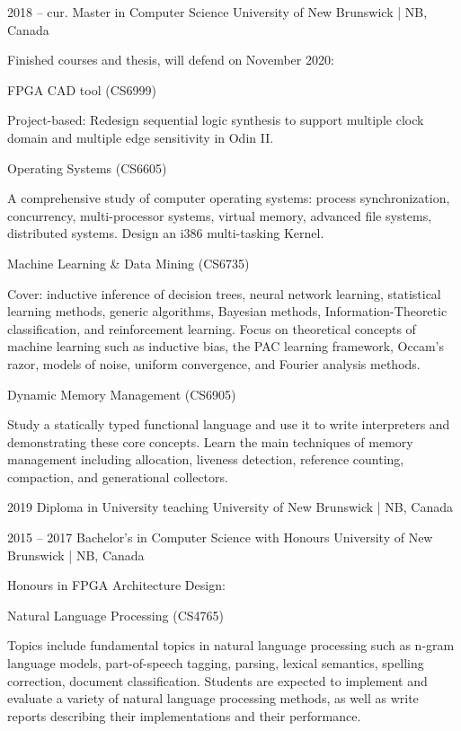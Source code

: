 \documentclass{developercv} %
\begin{document}

\begin{entrylist}

	\entry
	{2018 -- cur.}
	{Master in Computer Science}
	{University of New Brunswick | NB, Canada}
	{Finished courses and thesis, will defend on November 2020:

		\textbullet{} FPGA CAD tool (CS6999)
		\begin{smallQuote}
			Project-based: Redesign sequential logic synthesis to support multiple clock domain and multiple edge sensitivity in Odin II.
		\end{smallQuote}

		\textbullet{} Operating Systems (CS6605)
		\begin{smallQuote}
			A comprehensive study of computer operating systems: process synchronization, concurrency, multi-processor systems, virtual memory, advanced file systems, distributed systems. 
			Design an i386 multi-tasking Kernel.
		\end{smallQuote}

		\textbullet{} Machine Learning \& Data Mining (CS6735)
		\begin{smallQuote}
			Cover: inductive inference of decision trees, neural network learning, statistical learning methods, generic algorithms, Bayesian methods, Information-Theoretic classification, and reinforcement learning.
			Focus on theoretical concepts of machine learning such as inductive bias, the PAC learning framework, Occam's razor, models of noise, uniform convergence, and Fourier analysis methods.
		\end{smallQuote}

		\textbullet{} Dynamic Memory Management (CS6905)
		\begin{smallQuote}
			Study a statically typed functional language and use it to write interpreters and demonstrating these core concepts.
			Learn the main techniques of memory management including allocation, liveness detection, reference counting, compaction, and generational collectors.
		\end{smallQuote}
	}

	\shortentry
	{2019}
	{Diploma in University teaching}
	{University of New Brunswick | NB, Canada}

	\entry
	{2015 -- 2017}
	{Bachelor's in Computer Science with Honours}
	{University of New Brunswick | NB, Canada}
	{Honours in FPGA Architecture Design:

		\textbullet{} Natural Language Processing (CS4765)
		\begin{smallQuote}
			Topics include fundamental topics in natural language processing such as n-gram language models, part-of-speech tagging, parsing, lexical semantics, spelling correction, document classification.
			Students are expected to implement and evaluate a variety of natural language processing methods, as well as write reports describing their implementations and their performance.
		\end{smallQuote}

}
\end{entrylist}
\end{document}
